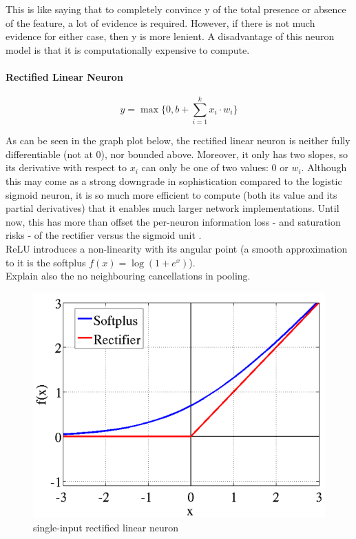\documentclass[a4paper,11pt]{article}
\begin{document}
This is like saying that to completely convince y of the total presence or absence of the feature, a lot of evidence is required. However, if there is not much evidence for either case, then y is more lenient. 
A disadvantage of this neuron model is that it is computationally expensive to compute.
                
\paragraph{Rectified Linear Neuron}
\begin{equation}
\label{relu}
y = \max\{0, b + \sum\limits_{i=1}^k x_{i}\cdot w_{i}\}
\end{equation}

As can be seen in the graph plot below, the rectified linear neuron is neither fully differentiable (not at $0$), nor bounded above. Moreover, it only has two slopes, so its derivative with respect to $x_{i}$ can only be one of two values: $0$ or $w_{i}$. Although this may come as a strong downgrade in sophistication compared to the logistic sigmoid neuron, it is so much more efficient to compute (both its value and its partial derivatives) that it enables much larger network implementations\cite{krizhevsky}. Until now, this has more than offset the per-neuron information loss - and saturation risks - of the rectifier versus the sigmoid unit \cite{rectifier}. \\

ReLU introduces a non-linearity with its angular point (a smooth approximation to it is the softplus $f(x) = \log(1 + e^x)$). \\

Explain also the no neighbouring cancellations in pooling. \\

\begin{figure}[h!]
	\centering
	\includegraphics[scale=0.3]{images/rectifier.png}
	\caption{single-input rectified linear neuron}
\end{figure}
\end{document}
